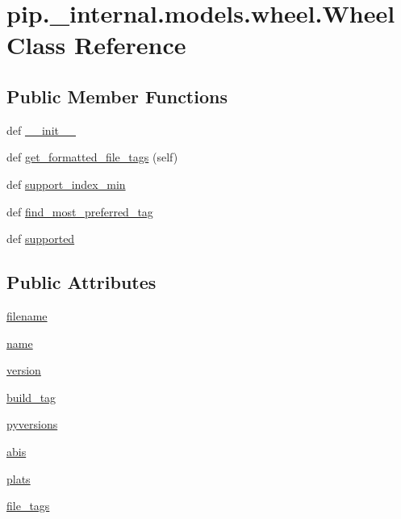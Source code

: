 \hypertarget{classpip_1_1__internal_1_1models_1_1wheel_1_1Wheel}{}\section{pip.\+\_\+internal.\+models.\+wheel.\+Wheel Class Reference}
\label{classpip_1_1__internal_1_1models_1_1wheel_1_1Wheel}
\subsection*{Public Member Functions}
\begin{DoxyCompactItemize}
\item 
def \hyperlink{classpip_1_1__internal_1_1models_1_1wheel_1_1Wheel_a781508f58527fe0e89774a32ca81b74d}{\+\_\+\+\_\+init\+\_\+\+\_\+}
\item 
def \hyperlink{classpip_1_1__internal_1_1models_1_1wheel_1_1Wheel_ab78677af648a4ff364250142eb255cbb}{get\+\_\+formatted\+\_\+file\+\_\+tags} (self)
\item 
def \hyperlink{classpip_1_1__internal_1_1models_1_1wheel_1_1Wheel_af0f25438c99bb48270ffc544a028cc79}{support\+\_\+index\+\_\+min}
\item 
def \hyperlink{classpip_1_1__internal_1_1models_1_1wheel_1_1Wheel_a99ee194838629de15ed8db3d06e2b773}{find\+\_\+most\+\_\+preferred\+\_\+tag}
\item 
def \hyperlink{classpip_1_1__internal_1_1models_1_1wheel_1_1Wheel_a05eb729136b588bc9da786314a31029b}{supported}
\end{DoxyCompactItemize}
\subsection*{Public Attributes}
\begin{DoxyCompactItemize}
\item 
\hyperlink{classpip_1_1__internal_1_1models_1_1wheel_1_1Wheel_ae82cb81891a5bf4771ebf9adce20c6d8}{filename}
\item 
\hyperlink{classpip_1_1__internal_1_1models_1_1wheel_1_1Wheel_a5de4ddfba974423ae91d6720130eda8f}{name}
\item 
\hyperlink{classpip_1_1__internal_1_1models_1_1wheel_1_1Wheel_a2f136b4ea67b0dc858445273b72efdfc}{version}
\item 
\hyperlink{classpip_1_1__internal_1_1models_1_1wheel_1_1Wheel_a29cc01bd0e7f22b8fb0c779099a094b3}{build\+\_\+tag}
\item 
\hyperlink{classpip_1_1__internal_1_1models_1_1wheel_1_1Wheel_a46a065e4c9c2b0ba0a4736842e5554b6}{pyversions}
\item 
\hyperlink{classpip_1_1__internal_1_1models_1_1wheel_1_1Wheel_ab6ab83904c90fc7013c6c94e76c477ea}{abis}
\item 
\hyperlink{classpip_1_1__internal_1_1models_1_1wheel_1_1Wheel_a49daa62ade1ad70c3cb6ce216161be9e}{plats}
\item 
\hyperlink{classpip_1_1__internal_1_1models_1_1wheel_1_1Wheel_ac3c96fb6abb5c8ae401ccd975e395942}{file\+\_\+tags}
\end{DoxyCompactItemize}
